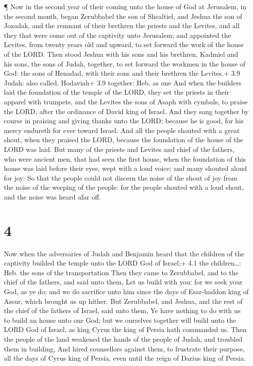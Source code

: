  ¶ Now in the second year of their coming unto the house of
God at Jerusalem, in the second month, began Zerubbabel the son of
Shealtiel, and Jeshua the son of Jozadak, and the remnant of their
brethren the priests and the Levites, and all they that were come out of
the captivity unto Jerusalem; and appointed the Levites, from twenty
years old and upward, to set forward the work of the house of the LORD.
 Then stood Jeshua with his sons and his brethren, Kadmiel
and his sons, the sons of Judah, together, to set forward the workmen in
the house of God: the sons of Henadad, with their sons and their
brethren the Levites.+ 3.9 Judah: also called, Hodaviah+ 3.9 together:
Heb. as one  And when the builders laid the foundation of
the temple of the LORD, they set the priests in their apparel with
trumpets, and the Levites the sons of Asaph with cymbals, to praise the
LORD, after the ordinance of David king of Israel.  And
they sang together by course in praising and giving thanks unto the
LORD; because he is good, for his mercy endureth for ever toward Israel.
And all the people shouted with a great shout, when they praised the
LORD, because the foundation of the house of the LORD was laid.
 But many of the priests and Levites and chief of the
fathers, who were ancient men, that had seen the first house, when the
foundation of this house was laid before their eyes, wept with a loud
voice; and many shouted aloud for joy:  So that the people
could not discern the noise of the shout of joy from the noise of the
weeping of the people: for the people shouted with a loud shout, and the
noise was heard afar off.

\hypertarget{section-3}{%
\section{4}\label{section-3}}

 Now when the adversaries of Judah and Benjamin heard that
the children of the captivity builded the temple unto the LORD God of
Israel;+ 4.1 the children\ldots: Heb. the sons of the transportation
 Then they came to Zerubbabel, and to the chief of the
fathers, and said unto them, Let us build with you: for we seek your
God, as ye do; and we do sacrifice unto him since the days of
Esar-haddon king of Assur, which brought us up hither.  But
Zerubbabel, and Jeshua, and the rest of the chief of the fathers of
Israel, said unto them, Ye have nothing to do with us to build an house
unto our God; but we ourselves together will build unto the LORD God of
Israel, as king Cyrus the king of Persia hath commanded us. 
Then the people of the land weakened the hands of the people of Judah,
and troubled them in building,  And hired counsellors
against them, to frustrate their purpose, all the days of Cyrus king of
Persia, even until the reign of Darius king of Persia.

